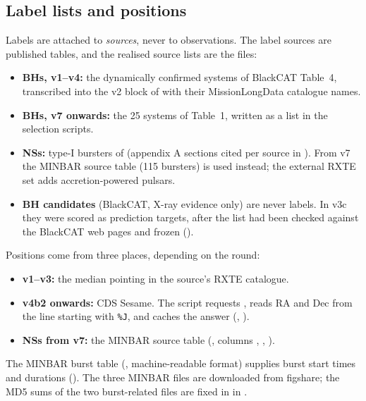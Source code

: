 \subsection{Label lists and positions}\label{sec:get-labels}
Labels are attached to \emph{sources}, never to observations. The label sources are published tables, and the realised
source lists are the  files:
\begin{itemize}
\item \textbf{BHs, v1--v4:} the dynamically confirmed systems of BlackCAT Table~4, transcribed into the v2 block of
 with their MissionLongData catalogue names.
\item \textbf{BHs, v7 onwards:} the 25 systems of \citet{Marcel2026} Table~1, written as a list in the selection scripts.
\item \textbf{NSs:} type-I bursters of \citet{Galloway2008} (appendix A sections cited per source in ). From
v7 the MINBAR source table (115 bursters) is used instead; the external RXTE set adds accretion-powered pulsars.
\item \textbf{BH candidates} (BlackCAT, X-ray evidence only) are never labels. In v3c they were scored as prediction
targets, after the list had been checked against the BlackCAT web pages and frozen ().
\end{itemize}

Positions come from three places, depending on the round:
\begin{itemize}
\item \textbf{v1--v3:} the median pointing in the source's RXTE catalogue.
\item \textbf{v4b2 onwards:} CDS Sesame. The script requests ,
reads RA and Dec from the line starting with \texttt{\%J}, and caches the answer (,
).
\item \textbf{NSs from v7:} the MINBAR source table (, columns , ,
).
\end{itemize}
The MINBAR burst table (, machine-readable format) supplies burst start times and durations
(). The three MINBAR files are downloaded from figshare; the MD5 sums of the two burst-related files
are fixed in  in .


